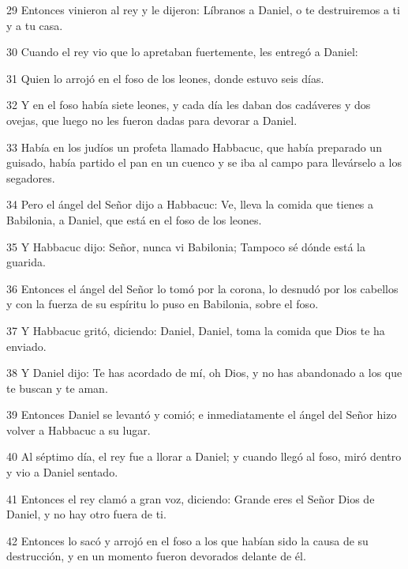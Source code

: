 \par 29 Entonces vinieron al rey y le dijeron: Líbranos a Daniel, o te destruiremos a ti y a tu casa.
\par 30 Cuando el rey vio que lo apretaban fuertemente, les entregó a Daniel:
\par 31 Quien lo arrojó en el foso de los leones, donde estuvo seis días.
\par 32 Y en el foso había siete leones, y cada día les daban dos cadáveres y dos ovejas, que luego no les fueron dadas para devorar a Daniel.
\par 33 Había en los judíos un profeta llamado Habbacuc, que había preparado un guisado, había partido el pan en un cuenco y se iba al campo para llevárselo a los segadores.
\par 34 Pero el ángel del Señor dijo a Habbacuc: Ve, lleva la comida que tienes a Babilonia, a Daniel, que está en el foso de los leones.
\par 35 Y Habbacuc dijo: Señor, nunca vi Babilonia; Tampoco sé dónde está la guarida.
\par 36 Entonces el ángel del Señor lo tomó por la corona, lo desnudó por los cabellos y con la fuerza de su espíritu lo puso en Babilonia, sobre el foso.
\par 37 Y Habbacuc gritó, diciendo: Daniel, Daniel, toma la comida que Dios te ha enviado.
\par 38 Y Daniel dijo: Te has acordado de mí, oh Dios, y no has abandonado a los que te buscan y te aman.
\par 39 Entonces Daniel se levantó y comió; e inmediatamente el ángel del Señor hizo volver a Habbacuc a su lugar.
\par 40 Al séptimo día, el rey fue a llorar a Daniel; y cuando llegó al foso, miró dentro y vio a Daniel sentado.
\par 41 Entonces el rey clamó a gran voz, diciendo: Grande eres el Señor Dios de Daniel, y no hay otro fuera de ti.
\par 42 Entonces lo sacó y arrojó en el foso a los que habían sido la causa de su destrucción, y en un momento fueron devorados delante de él.

